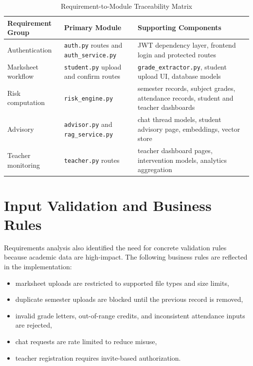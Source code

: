 \begin{table}[H]
\centering
\caption{Requirement-to-Module Traceability Matrix}
\begin{tabularx}{\textwidth}{>{\raggedright\arraybackslash}p{} >{\raggedright\arraybackslash}p{} >{\raggedright\arraybackslash}X}
\toprule
\textbf{Requirement Group} & \textbf{Primary Module} & \textbf{Supporting Components} \\
\midrule
Authentication & \texttt{auth.py} routes and \texttt{auth\_service.py} & JWT dependency layer, frontend login and protected routes \\
Marksheet workflow & \texttt{student.py} upload and confirm routes & \texttt{grade\_extractor.py}, student upload UI, database models \\
Risk computation & \texttt{risk\_engine.py} & semester records, subject grades, attendance records, student and teacher dashboards \\
Advisory & \texttt{advisor.py} and \texttt{rag\_service.py} & chat thread models, student advisory page, embeddings, vector store \\
Teacher monitoring & \texttt{teacher.py} routes & teacher dashboard pages, intervention models, analytics aggregation \\
\bottomrule
\end{tabularx}
\end{table}

\section{Input Validation and Business Rules}
Requirements analysis also identified the need for concrete validation rules because academic data are high-impact. The following business rules are reflected in the implementation:
\begin{itemize}[leftmargin=*]
\item marksheet uploads are restricted to supported file types and size limits,
\item duplicate semester uploads are blocked until the previous record is removed,
\item invalid grade letters, out-of-range credits, and inconsistent attendance inputs are rejected,
\item chat requests are rate limited to reduce misuse,
\item teacher registration requires invite-based authorization.
\end{itemize}

